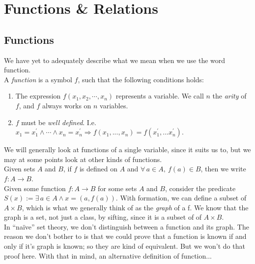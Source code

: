 \documentclass[12pt]{report}
\newcommand{\define}{  \noindent{\sc Definition }\hspace{5pt} }
\newcommand{\fall}{\forall\,}
\newcommand{\exst}{\exists\,}
\begin{document}
\section{Functions \& Relations}

\subsection{Functions}
We have yet to adequately describe what we mean when we use the word
function.\\

\define A  {\em function} is a symbol $f$, such that the
following conditions holds:
\begin{enumerate}
\item The expression $f(x_1, x_2, \cdots, x_n)$ represents a variable.
We call $n$ the  {\em arity} of $f$, and $f$ always works
on $n$ variables. 
\item $f$ must be  {\em well defined}. I.e. $x_1 =
x_1^{\prime} \land \cdots \land x_n = x_n^{\prime} \Rightarrow f(x_1, ...,
x_n) = f(x_1^\prime, ... x_n^\prime)$.\\
\end{enumerate}

We will generally look at functions of a single variable, since it suits us
to, but we may at some points look at other kinds of functions.\\

Given sets $A$ and $B$, if $f$ is defined on $A$ and
$\fall a \in A,\ f(a) \in B$, then we write $f:A\rightarrow B$.\\

\define {} Given some function $f:A\rightarrow B$ for some sets $A$
and $B$, consider the predicate 
$S(x) := \exst a \in A \land x = (a, f(a))$. With formation, we can define a
subset of $A \times B$, which is what we generally think of as the {\em graph}
of a f. We know that the graph is a set, not just a class, by sifting, since
it is a subset of of $A \times B$.\\

In ``na\"ive'' set theory, we don't distinguish between a function and its
graph. The reason we don't bother to is that we could prove that a function is
known if and only if it's graph is known; so they are kind of equivalent. But
we won't do that proof here. With that in mind, an alternative definition of
function...\\
\end{document}
